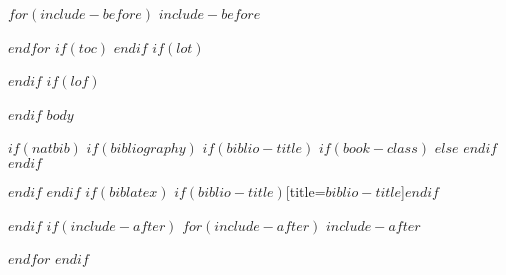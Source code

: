 \documentclass[$if(fontsize)$$fontsize$,$endif$$if(lang)$$babel-lang$,$endif$$if(papersize)$$papersize$,$endif$$for(classoption)$$classoption$$sep$,$endfor$]{$documentclass$}
\begin{document}
$for(include-before)$
$include-before$

$endfor$
$if(toc)$
{
\hypersetup{linkcolor=$if(toccolor)$$toccolor$$else$black$endif$}
\setcounter{tocdepth}{$toc-depth$}
\newpage
{}
\tableofcontents
}
$endif$
$if(lot)$
\listoftables
$endif$
$if(lof)$
\listoffigures
$endif$
$body$

$if(natbib)$
$if(bibliography)$
$if(biblio-title)$
$if(book-class)$
\renewcommand\bibname{$biblio-title$}
$else$
\renewcommand\refname{$biblio-title$}
$endif$
$endif$


$endif$
$endif$
$if(biblatex)$
\printbibliography$if(biblio-title)$[title=$biblio-title$]$endif$

$endif$
$if(include-after)$
\appendix
$for(include-after)$
$include-after$

$endfor$
$endif$
\end{document}

